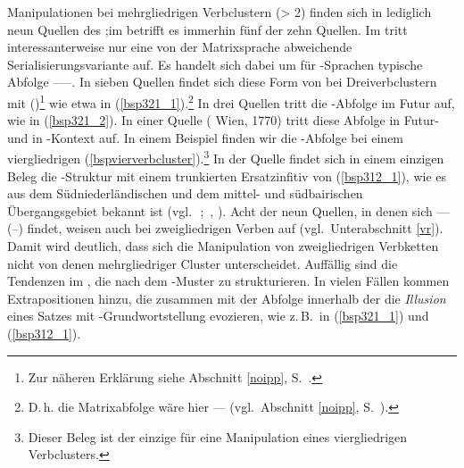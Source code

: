 Manipulationen bei mehrgliedrigen Verbclustern (> 2) finden sich in lediglich neun Quellen des ;im  betrifft es immerhin fünf der zehn Quellen. 
Im  tritt interessanterweise nur eine von der Matrixsprache abweichende Serialisierungsvariante auf. Es handelt sich dabei um für \hai{{\VO}}-Sprachen typische Abfolge –––. In sieben Quellen findet sich diese Form von \hai{{\VR}} bei Dreiverbclustern mit  (\hai{{\IPP}})\footnote{Zur näheren Erklärung siehe Abschnitt \ref{noipp}, S.\, \pageref{noipp}.} wie etwa in (\ref{bsp321_1}).\footnote{D.\,h. die Matrixabfolge wäre hier –– (vgl.\, Abschnitt \ref{noipp}, S.\, \pageref{noipp}).} 
 In drei Quellen tritt die \hai{{\VO}}-Abfolge im Futur auf, wie in (\ref{bsp321_2}). In einer Quelle ( Wien, 1770) tritt diese Abfolge in  Futur- und in \hai{{\IPP}}-Kontext auf. In einem Beispiel finden wir die \hai{{\VO}}-Abfolge bei einem viergliedrigen  (\ref{bspvierverbcluster}).\footnote{Dieser Beleg ist der einzige für eine Manipulation eines viergliedrigen Verbclusters.} In der Quelle \hai{{\PP}} findet sich in einem einzigen Beleg die \hai{{\VO}}-Struktur mit einem trunkierten Ersatzinfitiv von  (\ref{bsp312_1}), wie es aus dem Südniederländischen und dem mittel- und südbairischen Übergangsgebiet bekannt ist (vgl.\, \citealt{Hoehle2006}\,;\, \citealt{Weber2014,Schallert2013}, \citeyear[188]{Schallert2014}). Acht der neun Quellen, in denen sich ––(–) findet, weisen auch \hai{{\VR}} bei zweigliedrigen Verben auf (vgl.\, Unterabschnitt \ref{vr}). Damit wird deutlich, dass sich die Manipulation von zweigliedrigen Verbketten nicht von denen mehrgliedriger Cluster unterscheidet. Auffällig sind die Tendenzen im \hai{{\LiJieins}}, die  nach dem \hai{{\VO}}-Muster zu strukturieren. In vielen Fällen kommen Extrapositionen hinzu, die zusammen mit der Abfolge innerhalb der  die \textit{Illusion} eines Satzes mit \hai{{\VO}}-Grundwortstellung evozieren, wie z.\,B.\, in (\ref{bsp321_1}) und (\ref{bsp312_1}). 

